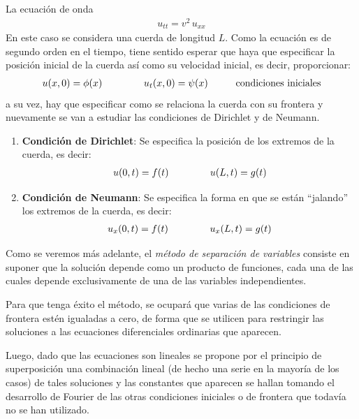 La ecuación de onda
\begin{align*}
u_{tt} = v^{2} \, u_{xx}
\end{align*}
En este caso se considera una cuerda de longitud $L$. Como la ecuación es de segundo orden en el tiempo, tiene sentido esperar que haya que especificar la posición inicial de la cuerda así como su velocidad inicial, es decir, proporcionar:
\begin{align}
u(x, 0) = \phi (x) \hspace{1.5cm} u_{t}(x, 0) = \psi (x) \hspace{1cm} \mbox{condiciones iniciales}
\label{eq:ecuacion_06_02_07}
\end{align}
a su vez, hay que especificar como se relaciona la cuerda con su frontera y nuevamente se van a estudiar las condiciones de Dirichlet y de Neumann.
\begin{enumerate}
\item \textbf{Condición de Dirichlet}: Se especifica la posición de los extremos de la cuerda, es decir:
\begin{align}
u(0, t) = f (t) \hspace{1.5cm} u(L, t) = g(t)
\label{eq:ecuacion_06_02_08}   
\end{align}
\item \textbf{Condición de Neumann}: Se especifica la forma en que se están \enquote{jalando} los extremos de la cuerda, es decir:
\begin{align}
u_{x}(0, t) = f(t) \hspace{1.5cm} u_{x}(L,t) = g(t)
\label{eq:ecuacion_06_02_09}    
\end{align}
\end{enumerate}
Como se veremos más adelante, el \emph{método de separación de variables} consiste en suponer que la solución depende como un producto de funciones, cada una de las cuales depende exclusivamente de una de las variables independientes.
\par
Para que tenga éxito el método, se ocupará que varias de las condiciones de frontera estén igualadas a cero, de forma que se utilicen para restringir las soluciones a las ecuaciones diferenciales ordinarias que aparecen.
\par
Luego, dado que las ecuaciones son lineales se propone por el principio de superposición una combinación lineal (de hecho una serie en la mayoría de los casos) de tales soluciones y las constantes que aparecen se hallan tomando el desarrollo de Fourier de las otras condiciones iniciales o de frontera que todavía no se han utilizado.

